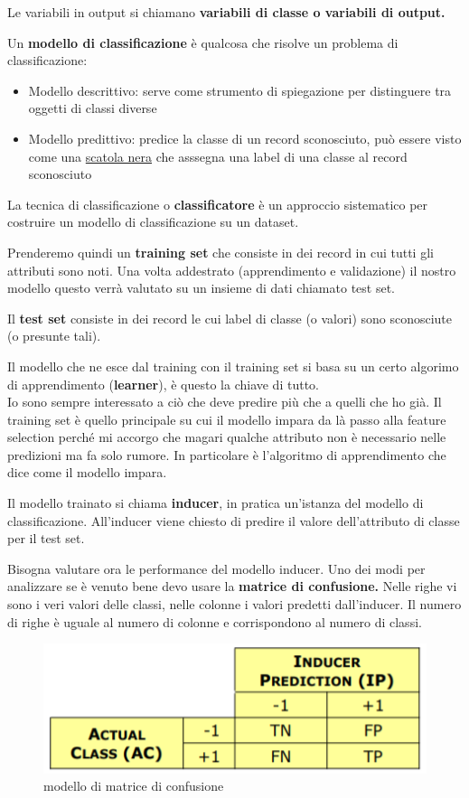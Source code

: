 \documentclass[12pt, a4paper,titlepage,openany]{article}
\begin{document}
Le variabili in output si chiamano \textbf{variabili di classe o variabili di output.}

Un \textbf{modello di classificazione} è qualcosa che risolve un problema di classificazione:
\begin{itemize}
	\item Modello descrittivo: serve come strumento di spiegazione per distinguere tra oggetti di classi diverse
	\item Modello predittivo: predice la classe di un record sconosciuto, pu\`o essere visto come una \underline{scatola nera} che asssegna una label di una classe al record sconosciuto
\end{itemize}

La tecnica di classificazione o \textbf{classificatore} è un approccio sistematico per costruire un modello di classificazione su un dataset.

Prenderemo quindi un \textbf{training set} che consiste in dei record in cui tutti gli attributi sono noti.  Una volta addestrato (apprendimento e validazione) il nostro modello questo verrà valutato su un insieme di dati chiamato test set.

Il \textbf{test set} consiste in dei record le cui label di classe (o valori) sono sconosciute (o presunte tali).

Il modello che ne esce dal training con il training set si basa su un certo algorimo di apprendimento (\textbf{learner}), \`e questo la chiave di tutto.
\\
Io sono sempre interessato a ciò che deve predire più che a quelli che ho già.
Il training set è  quello principale su cui il modello impara da là passo alla feature selection perché mi accorgo che magari qualche attributo non è necessario nelle predizioni ma fa solo rumore. In particolare è l'algoritmo di apprendimento che dice come il modello impara. 

Il modello trainato si chiama \textbf{inducer}, in pratica un'istanza del modello di classificazione. All'inducer viene chiesto di predire il valore dell'attributo di classe per il test set.

Bisogna valutare ora le performance del modello inducer. Uno dei modi per analizzare se è venuto bene devo usare la \textbf{matrice di confusione.} Nelle righe vi sono i veri valori delle classi, nelle colonne i valori predetti dall'inducer. Il numero di righe è uguale al numero di colonne e corrispondono al numero di classi.

\begin{figure}[h!]
	\centering
	\includegraphics[height=0.2 \linewidth]{pict/matrconf.png}
	\caption{modello di matrice di confusione}
\end{figure}
\end{document}
